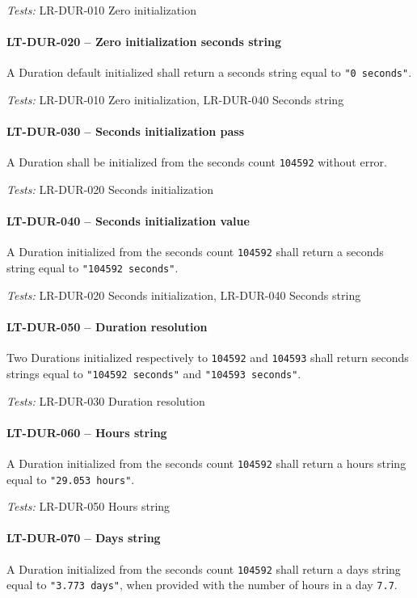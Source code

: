 \textit{Tests: } LR-DUR-010 Zero initialization

\paragraph{LT-DUR-020 -- Zero initialization seconds string}
A Duration default initialized shall return a seconds string
equal to \lstinline{"0 seconds"}.

\textit{Tests: } LR-DUR-010 Zero initialization, LR-DUR-040 Seconds string

\paragraph{LT-DUR-030 -- Seconds initialization pass}
A Duration shall be initialized from the seconds count \lstinline{104592}
without error.

\textit{Tests: } LR-DUR-020 Seconds initialization

\paragraph{LT-DUR-040 -- Seconds initialization value}
A Duration initialized from the seconds count \lstinline{104592}
shall return a seconds string equal to \lstinline{"104592 seconds"}.

\textit{Tests: } LR-DUR-020 Seconds initialization, LR-DUR-040 Seconds string

\paragraph{LT-DUR-050 -- Duration resolution}
Two Durations initialized respectively to \lstinline{104592} and
\lstinline{104593} shall return seconds strings equal to
\lstinline{"104592 seconds"} and \lstinline{"104593 seconds"}.

\textit{Tests: } LR-DUR-030 Duration resolution

\paragraph{LT-DUR-060 -- Hours string}
A Duration initialized from the seconds count \lstinline{104592}
shall return a hours string equal to \lstinline{"29.053 hours"}.

\textit{Tests: } LR-DUR-050 Hours string

\paragraph{LT-DUR-070 -- Days string}
A Duration initialized from the seconds count \lstinline{104592}
shall return a days string equal to \lstinline{"3.773 days"},
when provided with the number of hours in a day \lstinline{7.7}.

